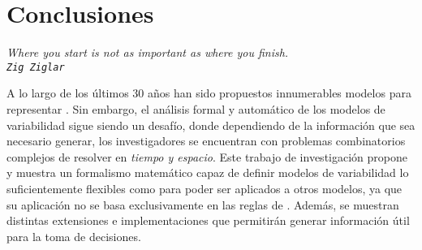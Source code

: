 \chapter{Conclusiones}
\label{chapter:conclusiones}

\begin{flushright}
\itshape{Where you start is not as important as where you finish.} \\

\texttt{Zig Ziglar}
\end{flushright}
\minitoc

A lo largo de los últimos 30 años han sido propuestos innumerables modelos para representar \SPLs. 
Sin embargo, el análisis formal y automático de los modelos de variabilidad sigue siendo un desafío, donde dependiendo de la información 
que sea necesario generar, los investigadores se encuentran con problemas combinatorios complejos de resolver en \emph{tiempo y espacio}.
Este trabajo de investigación propone y muestra un formalismo matemático capaz de definir modelos de variabilidad lo suficientemente
flexibles como para poder ser aplicados a otros modelos, ya que su aplicación no se basa exclusivamente en las reglas de \FODA. Además, se muestran distintas extensiones e implementaciones que permitirán generar información útil para la toma de decisiones.
 





